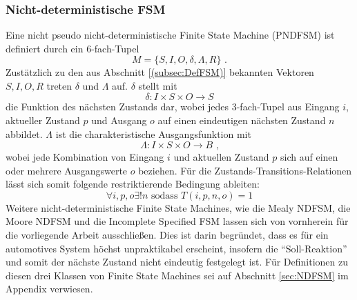 \subsubsection{Nicht-deterministische FSM}
\label{subsubsec:ClassNDFSM}
Eine nicht pseudo nicht-deterministische Finite State Machine (PNDFSM) ist definiert durch ein 6-fach-Tupel 
\begin{equation}
M = \{S,I,O,\delta,\Lambda,R\} \text{ .}
\label{eq:DefPNDFSM}
\end{equation}
Zustätzlich zu den aus Abschnitt \ref{(subsec:DefFSM)} bekannten Vektoren $S,I,O,R$ treten $\delta$ und $\Lambda$ auf. $\delta$ stellt mit
\begin{equation}
\delta : I \times S \times O \xrightarrow{} S
\label{eq:DefPNDFSMdelta}
\end{equation}
die Funktion des nächsten Zustands dar, wobei jedes 3-fach-Tupel aus Eingang $i$, aktueller Zustand $p$ und Ausgang $o$ auf einen eindeutigen nächsten Zustand $n$ abbildet. $\Lambda$ ist die charakteristische Ausgangsfunktion mit
\begin{equation}
\Lambda: I \times S \times O \xrightarrow{} B \text{ ,}
\label{eq:DefPNDFSMLambda}
\end{equation}
wobei jede Kombination von Eingang $i$ und aktuellen Zustand $p$ sich auf einen oder mehrere Ausgangswerte $o$ beziehen. Für die Zustands-Transitions-Relationen lässt sich somit folgende restriktierende Bedingung ableiten:
\begin{equation}
\forall i,p,o \exists! n \text{ sodass } T(i,p,n,o)=1
\label{eq:CondPNDFSMT} 
\end{equation}
Weitere nicht-deterministische Finite State Machines, wie die Mealy NDFSM, die Moore NDFSM und die Incomplete Specified FSM lassen sich von vornherein für die vorliegende Arbeit ausschließen. Dies ist darin begründet, dass es für ein automotives System höchst unpraktikabel erscheint, insofern die "`Soll-Reaktion"'  und somit der nächste Zustand nicht eindeutig festgelegt ist.
Für Definitionen zu diesen drei Klassen von Finite State Machines sei auf Abschnitt \ref{sec:NDFSM} im Appendix verwiesen.

